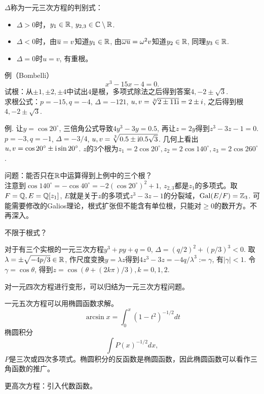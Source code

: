 $\Delta$称为一元三次方程的判别式：
\begin{itemize}
    \item $\Delta>0$时，$y_1\in\mathbb{R}$, $y_{2,3}\in\mathbb{C}\setminus\mathbb{R}$.
    \item $\Delta<0$时，由$\overline{u}=v$知道$y_1\in\mathbb{R}$, 由$\overline{\omega u}=\omega^2 v$知道$y_2\in\mathbb{R}$, 同理$y_3\in\mathbb{R}$.
    \item $\Delta=0$时$u=v$, 有重根。
\end{itemize}
例（Bombelli）
\begin{equation*}
    x^3-15x-4=0.
\end{equation*}
试根：从$\pm 1,\pm 2,\pm 4$中试出$4$是根，多项式除法之后得到答案$4,-2\pm\sqrt{3}$.\\
求根公式：$p=-15,q=-4$, $\Delta=-121$, $u,v=\sqrt[3]{2\pm 11\mathrm{i}}=2\pm i$, 之后得到根$4,-2\pm\sqrt{3}$.

例. 让$y=\cos 20^\circ$, 三倍角公式导致$4y^3-3y=0.5$, 再让$z=2y$得到$z^3-3z-1=0$. $p=-3,q=-1$, $\Delta=-3/4$, $u,v=\sqrt[3]{0.5\pm\mathrm{i} 0.5\sqrt{3}}$. 几何上看出$u,v=\cos 20^\circ\pm \mathrm{i}\sin 20^\circ$. $z$的3个根为$z_1=2\cos 20^\circ,z_2=2\cos 140^\circ,z_3=2\cos 260^\circ$.

问题：能否只在$\mathbb{R}$中运算得到上例中的三个根？\\
注意到$\cos 140^\circ=-\cos 40^\circ=-2(\cos 20^\circ)^2+1$, $z_{2,3}$都是$z_1$的多项式。取$F=\mathbb{Q},E=\mathbb{Q}[z_1]$, $E$就是关于$z$的多项式$z^3-3z-1$的分裂域，$\operatorname{Gal} (E/F)=\mathbb{Z}_3$. 可能需要修改的Galios理论，根式扩张但不能含有单位根，只能对$\geqslant 0$的数开方。不再深入。

不限于根式？

对于有三个实根的一元三次方程$y^3+py+q=0$, $\Delta=(q/2)^2+(p/3)^3<0$. 取$\lambda=\pm\sqrt{-4p/3}\in\mathbb{R}$, 作尺度变换$y=\lambda z$得到$4z^3-3z=-4q/\lambda^3:=\gamma$, 有$|\gamma|<1$. 令$\gamma=\cos\theta$, 得到$z=\cos (\theta+(2k\pi)/3),k=0,1,2$.

对一元四次方程进行变形，可以归结为一元三次方程问题。

一元五次方程可以用椭圆函数求解。
\begin{equation*}
    \arcsin x=\int_{0}^{x}(1-t^2)^{-1/2}dt
\end{equation*}
椭圆积分
\begin{equation*}
    \int P(x)^{-1/2}dx,
\end{equation*}
$P$是三次或四次多项式。椭圆积分的反函数是椭圆函数，因此椭圆函数可以看作三角函数的推广。

更高次方程：引入代数函数。